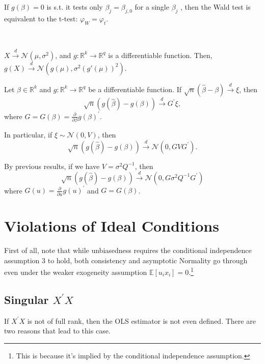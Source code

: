 If $g(\beta)=0$ is s.t. it tests only $\beta_{j}=\beta_{j, 0}$ for a single $\beta_{j}$ , then the Wald test is equivalent to the t-test:  $\varphi_{W}=\varphi_{t}$.

\begin{theorem}\label{Delta Method}
  \

  $X \overset{d}{\rightarrow}\mathcal{N} (\mu, \sigma^2)$, and $g: \mathbb{R}^k \rightarrow \mathbb{R}^q$ is a differentiable function. 
  Then, $g(X) \overset{d}{\rightarrow} \mathcal{N} (g(\mu), \sigma^2(g'(\mu))^2)$.

  Let $\beta \in \mathbb{R}^k$ and $g: \mathbb{R}^k \rightarrow \mathbb{R}^q$ be a differentiable function.
  If $\sqrt{n}(\hat{\beta} - \beta) \overset{d}{\rightarrow} \xi$, then
  \[ 
  \sqrt{n}(g(\hat{\beta}) - g(\beta)) \overset{d}{\rightarrow} G^{\prime} \xi,
  \]
  where $G = G(\beta) = \frac{\partial}{\partial \beta}g(\beta)^{\prime}.$

  In particular, if $\xi \sim \mathcal{N}(0, V)$, then
  \[\sqrt{n}(g(\hat{\beta}) - g(\beta)) \overset{d}{\rightarrow} \mathcal{N}(0, G V G^{\prime}).\]

  By previous results, if we have $V = \sigma^2 Q^{-1}$, then
  \[ 
    \sqrt{n}(g(\hat{\beta}) - g(\beta)) \overset{d}{\rightarrow} \mathcal{N} (0, G \sigma^2 Q^{-1} G^{\prime})
  \]
  where $G(u) = \frac{\partial}{\partial u}g(u)^{\prime} $ and $G = G(\beta )$.
\end{theorem}

\section{Violations of Ideal Conditions}

First of all, note that while unbiasedness requires the conditional independence assumption
3 to hold, both consistency and asymptotic Normality go through even under the weaker
exogeneity assumption $\mathbb{E}[u_i x_i] = 0.$\footnote{This is because it's implied by the conditional independence assumption.}

\subsection{Singular $X^{\prime} X$}
If $X^{\prime} X$ is not of full rank, then the OLS estimator is not even defined. There are two reasons
that lead to this case.

